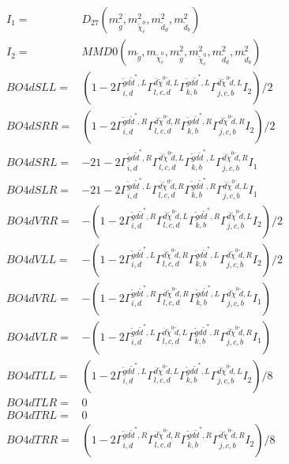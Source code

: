 \documentclass[A4,landscape]{article}
\begin{document}
\begin{align} 
I_1 = & D_{27}(m^2_{\tilde{g}}, m^2_{\tilde{\chi}^0_{{c}}}, m^2_{\tilde{d}_{{d}}}, m^2_{\tilde{d}_{{b}}}) \\ 
I_2 = & MMD0(m_{\tilde{g}}, m_{\tilde{\chi}^0_{{c}}}, m^2_{\tilde{g}}, m^2_{\tilde{\chi}^0_{{c}}}, m^2_{\tilde{d}_{{d}}}, m^2_{\tilde{d}_{{b}}}) \\ 
  BO4dSLL= & (1
-
2 \Gamma^{\tilde{g} d \tilde{d}^*,L}_{i, d} \Gamma^{\bar{d}\tilde{\chi}^0 \tilde{d} ,L}_{l, c, d} \Gamma^{\tilde{g} d \tilde{d}^*,L}_{k, b} \Gamma^{\bar{d}\tilde{\chi}^0 \tilde{d} ,L}_{j, c, b} I_2)/2 \\ 
  BO4dSRR= & (1
-
2 \Gamma^{\tilde{g} d \tilde{d}^*,R}_{i, d} \Gamma^{\bar{d}\tilde{\chi}^0 \tilde{d} ,R}_{l, c, d} \Gamma^{\tilde{g} d \tilde{d}^*,R}_{k, b} \Gamma^{\bar{d}\tilde{\chi}^0 \tilde{d} ,R}_{j, c, b} I_2)/2 \\ 
  BO4dSRL= & -2 1
-
2 \Gamma^{\tilde{g} d \tilde{d}^*,R}_{i, d} \Gamma^{\bar{d}\tilde{\chi}^0 \tilde{d} ,L}_{l, c, d} \Gamma^{\tilde{g} d \tilde{d}^*,L}_{k, b} \Gamma^{\bar{d}\tilde{\chi}^0 \tilde{d} ,R}_{j, c, b} I_1 \\ 
  BO4dSLR= & -2 1
-
2 \Gamma^{\tilde{g} d \tilde{d}^*,L}_{i, d} \Gamma^{\bar{d}\tilde{\chi}^0 \tilde{d} ,R}_{l, c, d} \Gamma^{\tilde{g} d \tilde{d}^*,R}_{k, b} \Gamma^{\bar{d}\tilde{\chi}^0 \tilde{d} ,L}_{j, c, b} I_1 \\ 
  BO4dVRR= & -(1
-
2 \Gamma^{\tilde{g} d \tilde{d}^*,R}_{i, d} \Gamma^{\bar{d}\tilde{\chi}^0 \tilde{d} ,L}_{l, c, d} \Gamma^{\tilde{g} d \tilde{d}^*,R}_{k, b} \Gamma^{\bar{d}\tilde{\chi}^0 \tilde{d} ,L}_{j, c, b} I_2)/2 \\ 
  BO4dVLL= & -(1
-
2 \Gamma^{\tilde{g} d \tilde{d}^*,L}_{i, d} \Gamma^{\bar{d}\tilde{\chi}^0 \tilde{d} ,R}_{l, c, d} \Gamma^{\tilde{g} d \tilde{d}^*,L}_{k, b} \Gamma^{\bar{d}\tilde{\chi}^0 \tilde{d} ,R}_{j, c, b} I_2)/2 \\ 
  BO4dVRL= & -(1
-
2 \Gamma^{\tilde{g} d \tilde{d}^*,R}_{i, d} \Gamma^{\bar{d}\tilde{\chi}^0 \tilde{d} ,R}_{l, c, d} \Gamma^{\tilde{g} d \tilde{d}^*,L}_{k, b} \Gamma^{\bar{d}\tilde{\chi}^0 \tilde{d} ,L}_{j, c, b} I_1) \\ 
  BO4dVLR= & -(1
-
2 \Gamma^{\tilde{g} d \tilde{d}^*,L}_{i, d} \Gamma^{\bar{d}\tilde{\chi}^0 \tilde{d} ,L}_{l, c, d} \Gamma^{\tilde{g} d \tilde{d}^*,R}_{k, b} \Gamma^{\bar{d}\tilde{\chi}^0 \tilde{d} ,R}_{j, c, b} I_1) \\ 
  BO4dTLL= & (1
-
2 \Gamma^{\tilde{g} d \tilde{d}^*,L}_{i, d} \Gamma^{\bar{d}\tilde{\chi}^0 \tilde{d} ,L}_{l, c, d} \Gamma^{\tilde{g} d \tilde{d}^*,L}_{k, b} \Gamma^{\bar{d}\tilde{\chi}^0 \tilde{d} ,L}_{j, c, b} I_2)/8 \\ 
  BO4dTLR= & 0 \\ 
  BO4dTRL= & 0 \\ 
  BO4dTRR= & (1
-
2 \Gamma^{\tilde{g} d \tilde{d}^*,R}_{i, d} \Gamma^{\bar{d}\tilde{\chi}^0 \tilde{d} ,R}_{l, c, d} \Gamma^{\tilde{g} d \tilde{d}^*,R}_{k, b} \Gamma^{\bar{d}\tilde{\chi}^0 \tilde{d} ,R}_{j, c, b} I_2)/8 \\ 
\end{align} 
\end{document}
